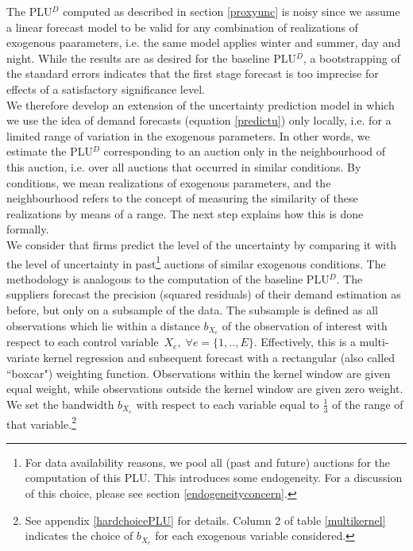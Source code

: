 The PLU$^D$ computed as described in section \ref{proxyunc} is noisy since we assume a linear forecast model to be valid for any combination of realizations of exogenous paarameters, i.e. the same model applies winter and summer, day and night. While the results are as desired for the baseline PLU$^D$, a bootstrapping of the standard errors indicates that the first stage forecast is too imprecise for effects of a satisfactory significance level. \\

We therefore develop an extension of the uncertainty prediction model in which we use the idea of demand forecasts (equation \ref{predictu}) only locally, i.e. for a limited range of variation in the exogenous parameters. In other words, we estimate the PLU$^D$ corresponding to an auction only in the neighbourhood of this auction, i.e. over all auctions that occurred in similar conditions. By conditions, we mean realizations of exogenous parameters, and the neighbourhood refers to the concept of measuring the similarity of these realizations by means of a range. The next step explains how this is done formally. \\

We consider that firms predict the level of the uncertainty by comparing it with the level of uncertainty in past\footnote{For data availability reasons, we pool all (past and future) auctions for the computation of this PLU. This introduces some endogeneity. For a discussion of this choice, please see section \ref{endogeneityconcern}.} auctions of similar exogenous conditions. 
The methodology is analogous to the computation of the baseline PLU$^D$. The suppliers forecast the precision (squared residuals) of their demand estimation as before, but only on a subsample of the data. The subsample is defined as all observations which lie within a distance $b_{X_e}$ of the observation of interest with respect to each control variable~$X_e , \; \forall e=\{1,..,E\}$. Effectively, this is a multi-variate kernel regression and subsequent forecast with a rectangular (also called ``boxcar") weighting function. Observations within the kernel window are given equal weight, while observations outside the kernel window are given zero weight. We set the bandwidth $b_{X_e}$ with respect to each variable equal to $\frac{1}{3}$ of the range of that variable.\footnote{See appendix \ref{hardchoicePLU} for details. Column 2 of table \ref{multikernel} indicates the choice of $b_{X_e}$ for each exogenous variable considered.} \\

